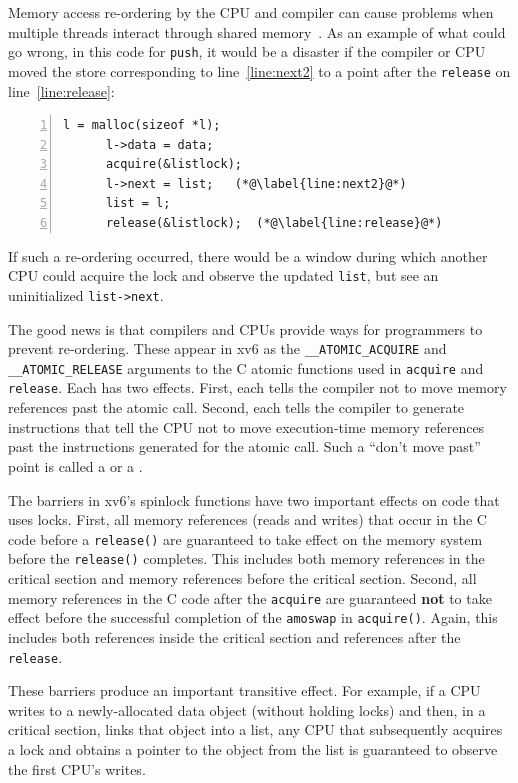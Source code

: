 Memory access re-ordering by the CPU and compiler can cause
problems when
multiple threads interact through shared memory~\cite{riscv:user,boehm04}.
As an example of what could go wrong,
in this code for
\lstinline{push},
it would be a disaster if the compiler or CPU moved the
store corresponding to
line~\ref{line:next2} to a point after the
\lstinline{release}
on line~\ref{line:release}:
\begin{lstlisting}[numbers=left,firstnumber=1]
      l = malloc(sizeof *l);
      l->data = data;
      acquire(&listlock);
      l->next = list;   (*@\label{line:next2}@*)
      list = l;      
      release(&listlock);  (*@\label{line:release}@*)
\end{lstlisting}
If such a re-ordering occurred, there would be a window during
which another CPU could acquire the lock and
observe the updated
\lstinline{list},
but see an uninitialized
\lstinline{list->next}.

The good news is that compilers and CPUs provide ways
for programmers to prevent re-ordering.
These appear in xv6 as
the \lstinline{__ATOMIC_ACQUIRE} and \lstinline{__ATOMIC_RELEASE}
arguments to the C atomic functions
used in \lstinline{acquire} and \lstinline{release}.
Each has two effects.
First, each tells the compiler not to move memory references
past the atomic call.
Second, each tells the compiler to generate instructions
that tell the CPU not to move execution-time memory references past the
instructions generated for the atomic call.
Such a ``don't move past'' point is called
a  or 
a .

The barriers in xv6's spinlock functions have two important
effects on code that uses locks. First, all memory references
(reads and writes) that occur in the C code 
before a \lstinline{release()}
are guaranteed to take effect on the memory system
before the \lstinline{release()}
completes. This includes
both memory references in the critical section and memory
references before the critical section. Second, all memory
references in the C code after the \lstinline{acquire}
are guaranteed {\bf not} to take effect before the successful
completion of the \lstinline{amoswap} in \lstinline{acquire()}.
Again, this includes both references inside the critical
section and references after the \lstinline{release}.

These barriers produce an important transitive effect. For example, if
a CPU writes to a newly-allocated data object (without holding locks)
and then, in a critical section, links that object into a list, any
CPU that subsequently acquires a lock and obtains a pointer to the
object from the list is guaranteed to observe the first CPU's writes.


